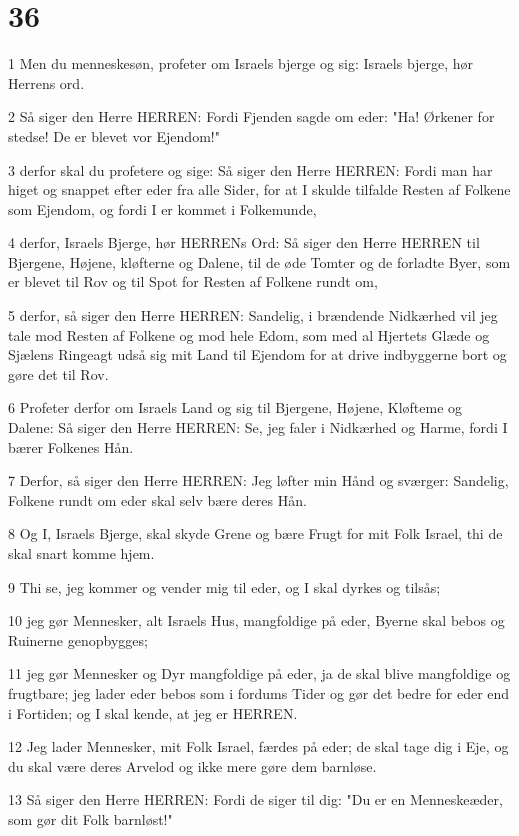 \chapter{36}

\par 1 Men du menneskesøn, profeter om Israels bjerge og sig: Israels bjerge, hør Herrens ord.
\par 2 Så siger den Herre HERREN: Fordi Fjenden sagde om eder: "Ha! Ørkener for stedse! De er blevet vor Ejendom!"
\par 3 derfor skal du profetere og sige: Så siger den Herre HERREN: Fordi man har higet og snappet efter eder fra alle Sider, for at I skulde tilfalde Resten af Folkene som Ejendom, og fordi I er kommet i Folkemunde,
\par 4 derfor, Israels Bjerge, hør HERRENs Ord: Så siger den Herre HERREN til Bjergene, Højene, kløfterne og Dalene, til de øde Tomter og de forladte Byer, som er blevet til Rov og til Spot for Resten af Folkene rundt om,
\par 5 derfor, så siger den Herre HERREN: Sandelig, i brændende Nidkærhed vil jeg tale mod Resten af Folkene og mod hele Edom, som med al Hjertets Glæde og Sjælens Ringeagt udså sig mit Land til Ejendom for at drive indbyggerne bort og gøre det til Rov.
\par 6 Profeter derfor om Israels Land og sig til Bjergene, Højene, Kløfteme og Dalene: Så siger den Herre HERREN: Se, jeg faler i Nidkærhed og Harme, fordi I bærer Folkenes Hån.
\par 7 Derfor, så siger den Herre HERREN: Jeg løfter min Hånd og sværger: Sandelig, Folkene rundt om eder skal selv bære deres Hån.
\par 8 Og I, Israels Bjerge, skal skyde Grene og bære Frugt for mit Folk Israel, thi de skal snart komme hjem.
\par 9 Thi se, jeg kommer og vender mig til eder, og I skal dyrkes og tilsås;
\par 10 jeg gør Mennesker, alt Israels Hus, mangfoldige på eder, Byerne skal bebos og Ruinerne genopbygges;
\par 11 jeg gør Mennesker og Dyr mangfoldige på eder, ja de skal blive mangfoldige og frugtbare; jeg lader eder bebos som i fordums Tider og gør det bedre for eder end i Fortiden; og I skal kende, at jeg er HERREN.
\par 12 Jeg lader Mennesker, mit Folk Israel, færdes på eder; de skal tage dig i Eje, og du skal være deres Arvelod og ikke mere gøre dem barnløse.
\par 13 Så siger den Herre HERREN: Fordi de siger til dig: "Du er en Menneskeæder, som gør dit Folk barnløst!"
